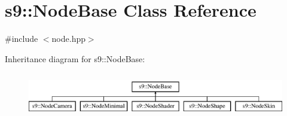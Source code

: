 \hypertarget{classs9_1_1NodeBase}{\section{s9\-:\-:Node\-Base Class Reference}
\label{classs9_1_1NodeBase}
}


{\ttfamily \#include $<$node.\-hpp$>$}

Inheritance diagram for s9\-:\-:Node\-Base\-:\begin{figure}[H]
\begin{center}
\leavevmode
\includegraphics[height=1.982301cm]{classs9_1_1NodeBase}
\end{center}
\end{figure}
